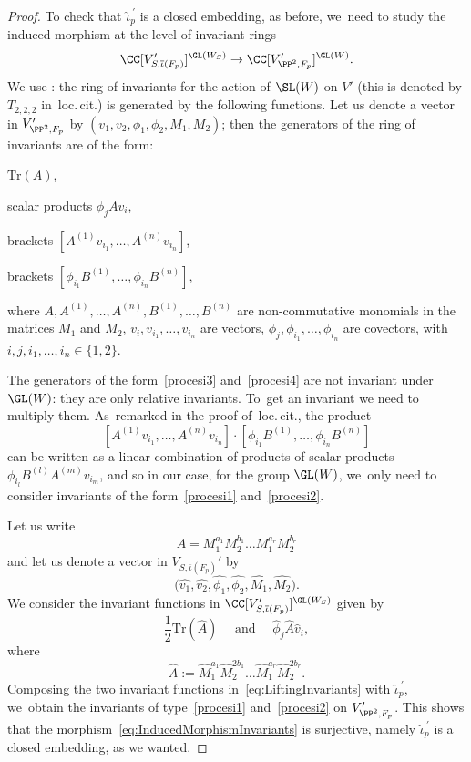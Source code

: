 \begin{proof}
To check that $\widehat{\iota}_p^{\ \prime}$ is a closed embedding, as before, we~need to study the induced morphism at the level of invariant rings
\begin{equation}\label{eq:InducedMorphismInvariants}
\CC[V_{S,\overline{\iota}(F_p)}']^{\GL(W_S)}\to \CC[V_{\PP^2,F_p}']^{\GL(W)}.
\end{equation}
We use \cite[Th.\,12.1]{procesi:invariants}: the ring of invariants for the action of $\SL(W)$ on $V'$ (this is denoted by $T_{2,2,2}$ in~loc.\,cit.) is generated by the following functions.
Let us denote a vector in $V_{\PP^2,F_p}'$ by $(v_1,v_2,\phi_1,\phi_2,M_1,M_2)$; then the generators of the ring of invariants are of the form:
\begin{enumeratea}
\item\label{procesi1} $\mathrm{Tr}(A)$,
\item\label{procesi2} scalar products $\phi_jAv_i$,
\item\label{procesi3} brackets $[A^{(1)}v_{i_1},\dots,A^{(n)} v_{i_n}]$,
\item\label{procesi4} brackets $[\phi_{i_1}B^{(1)},\dots,\phi_{i_n} B^{(n)}]$,
\end{enumeratea}
where $A,A^{(1)},\dots,A^{(n)},B^{(1)},\dots,B^{(n)}$ are non-commutative monomials in the matrices $M_1$ and $M_2$, $v_i,v_{i_1},\dots,v_{i_n}$ are vectors, $\phi_j,\phi_{i_1},\dots,\phi_{i_n}$ are covectors, with $i,j,i_1,\dots,i_n\in\{1,2\}$.

The generators of the form~\ref{procesi3} and~\ref{procesi4} are not invariant under $\GL(W)$: they are only relative invariants. To~get an invariant we need to multiply them. As~remarked in the proof of~loc.\,cit., the product
\[
[A^{(1)}v_{i_1},\dots,A^{(n)} v_{i_n}] \cdot [\phi_{i_1}B^{(1)},\dots,\phi_{i_n} B^{(n)}]
\]
can be written as a linear combination of products of scalar products $\phi_{i_l}B^{(l)}A^{(m)}v_{i_m}$, and so in our case, for the group $\GL(W)$, we~only need to consider invariants of the form~\ref{procesi1} and~\ref{procesi2}.

Let us write
\[
A=M_1^{a_1}M_2^{b_1}\dots M_1^{a_r}M_2^{b_r}
\]
and let us denote a vector in $V_{S,\overline{\iota}(F_p)}'$ by
\[
\bigl(\widehat{v_1},\widehat{v_2},\widehat{\phi_1},\widehat{\phi_2},\widehat{M_1},\widehat{M_2}\bigr).
\]
We consider the invariant functions in $\CC[V_{S,\overline{\iota}(F_p)}']^{\GL(W_S)}$ given by
\begin{equation}\label{eq:LiftingInvariants}
\frac 12 \mathrm{Tr} (\widehat{A})\quad \text{ and }\quad \widehat{\phi}_j \widehat{A} \widehat{v}_i,
\end{equation}
where
\[
\widehat{A} := \widehat{M}_1^{a_1}\widehat{M}_2^{2b_1}\dots \widehat{M}_1^{a_r}\widehat{M}_2^{2b_r}.
\]
Composing the two invariant functions in~\eqref{eq:LiftingInvariants} with $\widehat{\iota}_p^{\ \prime}$, we~obtain the invariants of type~\ref{procesi1} and~\ref{procesi2} on $V_{\PP^2,F_p}'$.
This shows that the morphism~\eqref{eq:InducedMorphismInvariants} is surjective, namely $\widehat{\iota}_p^{\ \prime}$ is a closed embedding, as we wanted.
\end{proof}


